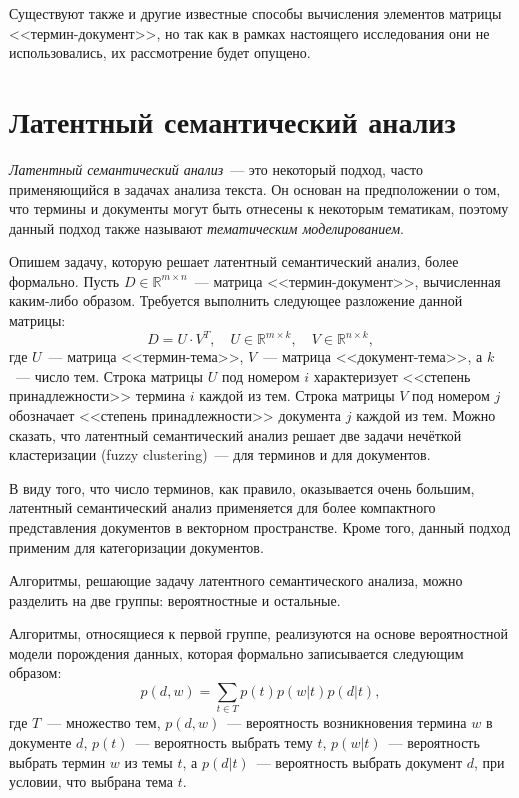 Существуют также и другие известные способы вычисления элементов
матрицы <<термин-документ>>, но так как в рамках настоящего исследования
они не использовались, их рассмотрение будет опущено.

\section{Латентный семантический анализ}
\label{sec:latent_semantic_analysis}
\textit{Латентный семантический анализ}~--- это некоторый подход,
часто применяющийся в задачах анализа текста. Он основан на
предположении о том, что термины и документы могут быть отнесены
к некоторым тематикам, поэтому данный подход также называют
\textit{тематическим моделированием}.

Опишем задачу, которую решает латентный семантический анализ,
более формально. Пусть $D \in \mathbb{R}^{m \times n}$~--- матрица 
<<термин-документ>>, вычисленная каким-либо образом. Требуется
выполнить следующее разложение данной матрицы:
\[
    D = U \cdot V^T,\quad U \in \mathbb{R}^{m \times k},\quad V \in \mathbb{R}^{n \times k},
\]
где $U$~--- матрица <<термин-тема>>, $V$~--- матрица <<документ-тема>>,
а $k$~--- число тем. Строка матрицы $U$ под номером $i$ 
характеризует <<степень принадлежности>> термина $i$ 
каждой из тем. Строка матрицы $V$ под номером $j$ обозначает
<<степень принадлежности>> документа $j$ каждой из тем.
Можно сказать, что латентный семантический анализ решает
две задачи нечёткой кластеризации (fuzzy clustering)~--- для
терминов и для документов.

В виду того, что число терминов, как правило,
оказывается очень большим, латентный семантический анализ
применяется для более компактного представления 
документов в векторном пространстве. Кроме того, данный подход
применим для категоризации документов.

Алгоритмы, решающие задачу латентного семантического анализа,
можно разделить на две группы: вероятностные и остальные.

Алгоритмы, относящиеся к первой группе, реализуются на
основе вероятностной модели порождения данных, которая
формально записывается следующим образом:
\[
    p(d, w) = \sum_{t \in T} p(t)p(w|t)p(d|t),
\]
где $T$~--- множество тем, $p(d, w)$~--- вероятность возникновения
термина $w$ в документе $d$, $p(t)$~--- вероятность выбрать тему $t$,
$p(w|t)$~--- вероятность выбрать термин $w$ из темы $t$, а
$p(d|t)$~--- вероятность выбрать документ $d$, при условии, что
выбрана тема $t$.

